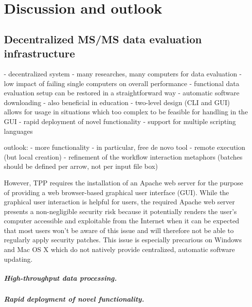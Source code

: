 \chapter{Discussion and outlook}


\section{Decentralized MS/MS data evaluation infrastructure}



\begin{todo}
- decentralized system
- many researches, many computers for data evaluation
- low impact of failing single computers on overall performance 
- functional data evaluation setup can be restored in a straightforward way
- automatic software downloading
- also beneficial in education
- two-level design (CLI and GUI) allows for usage in situations which too 
  complex to be feasible for handling in the GUI
- rapid deployment of novel functionality
- support for multiple scripting languages

outlook:
- more functionality
- in particular, free de novo tool
- remote execution (but local creation)
- refinement of the workflow interaction metaphors (batches should be defined
  per arrow, not per input file box)
\end{todo}

However, TPP requires the installation of an Apache web server for the purpose
of providing a web browser-based graphical user interface (GUI).
While the graphical user interaction is helpful for users, the required Apache 
web server presents a non-negligible security risk because it potentially renders 
the user's computer accessible and exploitable from the Internet when it can be 
expected that most users won't be aware of this issue and will therefore not 
be able to regularly apply security patches. 
This issue is especially precarious on Windows and Mac OS X which do not 
natively provide centralized, automatic software updating.

\paragraph{High-throughput data processing.}

\paragraph{Rapid deployment of novel functionality.}

